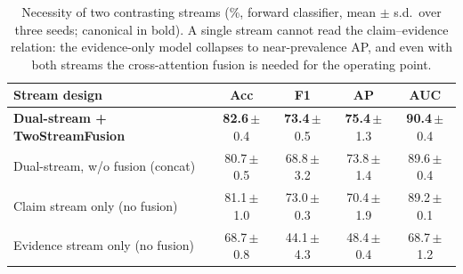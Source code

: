 \documentclass[11pt]{article}
\newcommand{\best}[1]{\textbf{#1}}
\begin{document}
\begin{table}[t]
\centering\small
\setlength{\tabcolsep}{6pt}
\newcommand{\pmsd}[1]{\,{\scriptsize$\pm$#1}}
\begin{tabular}{lcccc}
\toprule
\textbf{Stream design} & \textbf{Acc} & \textbf{F1} & \textbf{AP} & \textbf{AUC} \\
\midrule
\textbf{Dual-stream + TwoStreamFusion} & \best{82.6}\pmsd{0.4} & \best{73.4}\pmsd{0.5} & \best{75.4}\pmsd{1.3} & \best{90.4}\pmsd{0.4} \\
\midrule
\quad Dual-stream, w/o fusion (concat) & 80.7\pmsd{0.5} & 68.8\pmsd{3.2} & 73.8\pmsd{1.4} & 89.6\pmsd{0.4} \\
\quad Claim stream only (no fusion)    & 81.1\pmsd{1.0} & 73.0\pmsd{0.3} & 70.4\pmsd{1.9} & 89.2\pmsd{0.1} \\
\quad Evidence stream only (no fusion) & 68.7\pmsd{0.8} & 44.1\pmsd{4.3} & 48.4\pmsd{0.4} & 68.7\pmsd{1.2} \\
\bottomrule
\end{tabular}
\caption{Necessity of two contrasting streams (\%, forward classifier, mean
$\pm$ s.d.\ over three seeds; canonical in bold). A single stream cannot read the
claim--evidence relation: the evidence-only model collapses to near-prevalence AP,
and even with both streams the cross-attention fusion is needed for the operating
point.}
\label{tab:abl_stream}
\end{table}
\end{document}
